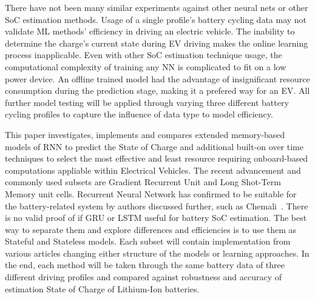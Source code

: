 There have not been many similar experiments against other neural nets or other SoC estimation methods.
Usage of a single profile's battery cycling data may not validate ML methods' efficiency in driving an electric vehicle.
The inability to determine the charge's current state during EV driving makes the online learning process inapplicable.
Even with other SoC estimation technique usage, the computational complexity of training any NN is complicated to fit on a low power device.
An offline trained model had the advantage of insignificant resource consumption during the prediction stage, making it a prefered way for an EV.
All further model testing will be applied through varying three different battery cycling profiles to capture the influence of data type to model efficiency.

%
%
This paper investigates, implements and compares extended memory-based models of RNN to predict the State of Charge and additional built-on over time techniques to select the most effective and least resource requiring onboard-based computations appliable within Electrical Vehicles.
The recent advancement and commonly used subsets are Gradient Recurrent Unit and Long Shot-Term Memory unit cells. Recurrent Neural Network has confirmed to be suitable for the battery-related system by authors discussed further, such as Chemali~\cite{LSTM_Hochreiter1997}.
There is no valid proof of if GRU or LSTM useful for battery SoC estimation.
The best way to separate them and explore differences and efficiencies is to use them as Stateful and Stateless models.
Each subset will contain implementation from various articles changing either structure of the models or learning approaches.
In the end, each method will be taken through the same battery data of three different driving profiles and compared against robustness and accuracy of estimation State of Charge of Lithium-Ion batteries.

